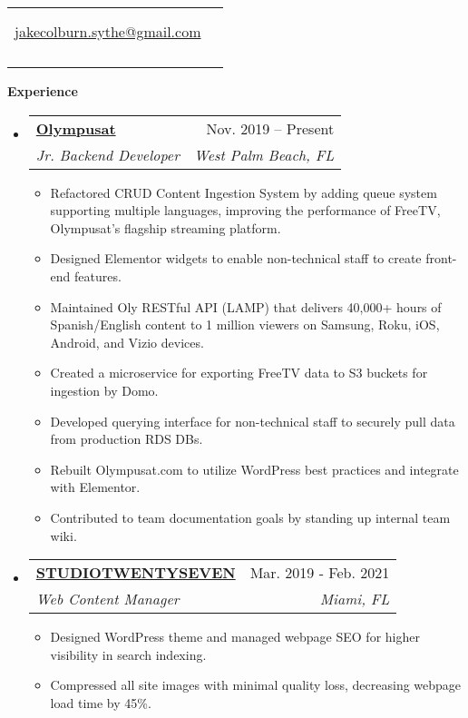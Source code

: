 \documentclass[letterpaper,10pt]{article}[leftmargin=*]
\makeatletter
\def \fullname {Jake Colburn}
\def \subtitle {}
\def \linkedinicon {\faLinkedin}
\def \linkedinlink {https://www.linkedin.com/in/jake-colburn-71401811/}
\def \linkedintext {/jake-colburn}
\def \phoneicon {\faPhone}
\def \phonetext {954-347-0199}
\def \emailicon {\faEnvelope}
\def \emaillink {mailto:jakecolburn.sythe@gmail.com}
\def \emailtext {jakecolburn.sythe@gmail.com}
\def \headertype {\singlecol} %
\def \entryspacing {-0pt}
\def \linkedin {\linkedinicon \hspace{3pt}\href{\linkedinlink}{\linkedintext}}
\def \phone {\phoneicon \hspace{3pt}{ \phonetext}}
\def \email {\emailicon \hspace{3pt}\href{\emaillink}{\emailtext}}
\def \website {\websiteicon \hspace{3pt}\href{\websitelink}{\websitetext}}
\renewcommand{\section}[2]{\vspace{5pt}
  \colorbox{secondary}{\color{white}\raggedbottom\normalsize\textbf{{#1}{\hspace{7pt}#2}}}
}
\newcommand{\resumeEntryStart}{\begin{itemize}[leftmargin=2.5mm]}
\newcommand{\resumeEntryEnd}{\end{itemize}\vspace{\entryspacing}}
\newcommand{\resumeItemListStart}{\begin{itemize}[leftmargin=4.5mm]}
\newcommand{\resumeItemListEnd}{\end{itemize}}
\newcommand{\resumeItem}[1]{
  \item\small{
    {#1 \vspace{-2pt}}
  }
}
\newcommand{\resumeEntryTSDL}[4]{
  \vspace{-1pt}\item[]
    \begin{tabularx}{0.97\textwidth}{X@{\hspace{60pt}}r}
      \textbf{\color{primary}#1} & {\firabook\color{accent}\small#2} \\
      \textit{\color{accent}\small#3} & \textit{\color{accent}\small#4} \\
    \end{tabularx}\vspace{-6pt}
}
\newcommand{\doublecol}[6]{
  \begin{tabularx}{\textwidth}{Xr}
    {
      \begin{tabular}[c]{l}
        \fontsize{35}{45}\selectfont{\color{primary}{{\textbf{\fullname}}}} \\
        {\textit{\subtitle}} %
      \end{tabular}
    } & {
      \begin{tabular}[c]{l@{\hspace{1.5em}}l}
        {\small#4} & {\small#1} \\
        {\small#5} & {\small#2} \\
        {\small#6} & {\small#3}
      \end{tabular}
    }
  \end{tabularx}
}
\newcommand{\singlecol}[6]{
  \begin{tabularx}{\textwidth}{Xr}
    {
      \begin{tabular}[b]{l}
        \fontsize{35}{45}\selectfont{\color{primary}{{\textbf{\fullname}}}} \\
        {\textit{\subtitle}} %
      \end{tabular}
    } & {
      \begin{tabular}[c]{l}
        {\small#1} \\
        {\small#2} \\
        {\small#3} \\
        {\small#4} \\
        {\small#5} \\
        {\small#6}
      \end{tabular}
    }
  \end{tabularx}
}
\makeatother
\begin{document}


\headertype{\linkedin}{\email}{\website}{\phone}{}{} %
\vspace{-10pt} %

\section{\faPieChart}{Experience}

  \resumeEntryStart
    \resumeEntryTSDL
      {\href{https://www.linkedin.com/company/olympusat/}{Olympusat}}{Nov. 2019 -- Present}
      {Jr. Backend Developer}{West Palm Beach, FL}
    \resumeItemListStart
      \resumeItem {Refactored CRUD Content Ingestion System by adding queue system supporting multiple languages, improving the performance of FreeTV, Olympusat’s flagship streaming platform.}
      \resumeItem {Designed Elementor widgets to enable non-technical staff to create front-end features.}
      \resumeItem {Maintained Oly RESTful API (LAMP) that delivers 40,000+ hours of Spanish/English content to 1 million viewers on Samsung, Roku, iOS, Android, and Vizio devices.}
        \resumeItem{Created a microservice for exporting FreeTV data to S3 buckets for ingestion by Domo.}
        \resumeItem{Developed querying interface for non-technical staff to securely pull data from production RDS DBs.}
        \resumeItem{Rebuilt Olympusat.com to utilize WordPress best practices and integrate with Elementor.}
        \resumeItem{Contributed to team documentation goals by standing up internal team wiki.}
    \resumeItemListEnd
  \resumeEntryEnd

  \resumeEntryStart
    \resumeEntryTSDL
      {\href{https://studiotwentyseven.com/}{STUDIOTWENTYSEVEN}}{Mar. 2019 - Feb. 2021}
      {Web Content Manager}{Miami, FL}
    \resumeItemListStart
      \resumeItem {Designed WordPress theme and managed webpage SEO for higher visibility in search indexing.}
      \resumeItem {Compressed all site images with minimal quality loss, decreasing webpage load time by 45\%.}
    \resumeItemListEnd
  \resumeEntryEnd
\end{document}
